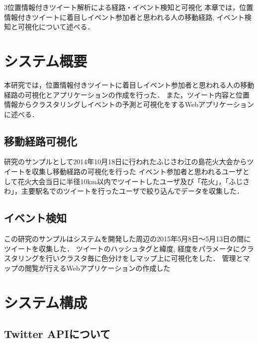 \chapterhead
{3}{位置情報付きツイート解析による経路・イベント検知と可視化}
{本章では，位置情報付きツイートに着目しイベント参加者と思われる人の移動経路, イベント検知と可視化について述べる．}


\section{システム概要}
本研究では，位置情報付きツイートに着目しイベント参加者と思われる人の移動経路の可視化とアプリケーションの作成を行った．
また，ツイート内容と位置情報からクラスタリングしイベントの予測と可視化をするWebアプリケーションに述べる．

\subsection{移動経路可視化}
研究のサンプルとして2014年10月18日に行われたふじさわ江の島花火大会\cite{webpagefujisawa}からツイートを収集し移動経路の可視化を行った
イベント参加者と思われるユーザとして花火大会当日に半径10km以内でツイートしたユーザ及び「花火」，「ふじさわ」，主要駅名でのツイートを行ったユーザで絞り込んでデータを収集した．


\subsection{イベント検知}
この研究のサンプルはシステムを開発した周辺の2015年5月8日〜5月13日の間にツイートを収集した．
ツイートのハッシュタグと緯度, 経度をパラメータにクラスタリングを行いクラスタ毎に色分けをしマップ上に可視化をした．
管理とマップの閲覧が行えるWebアプリケーションの作成した



\newpage

\section{システム構成}
\subsection{Twitter APIについて}
